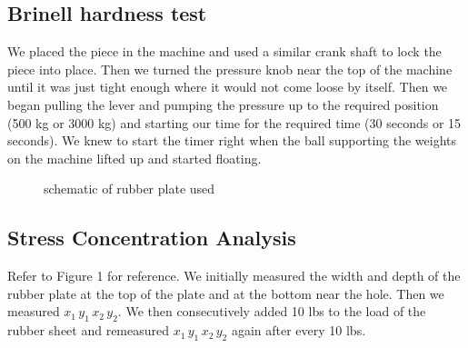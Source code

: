 \documentclass{article}
\begin{document}
\subsection{Brinell hardness test}
We placed the piece in the machine and used a similar crank shaft to lock the piece into place. Then we turned the pressure knob near the top of the machine until it was just tight enough where it would not come loose by itself. Then we began pulling the lever and pumping the pressure up to the required position (500 kg or 3000 kg) and starting our time for the required time (30 seconds or 15 seconds). We knew to start the timer right when the ball supporting the weights on the machine lifted up and started floating.

\begin{figure}[H]
\caption{schematic of rubber plate used}
\centering
{}
\end{figure}

 \subsection{Stress Concentration Analysis}
Refer to Figure 1 for reference. We initially measured the width and depth of the rubber plate at the top of the plate and at the bottom near the hole. Then we measured $x_1 \,y_1 \,x_2 \,y_2$. We then consecutively added 10 lbs to the load of the rubber sheet and remeasured $x_1 \,y_1 \,x_2 \,y_2$ again after every 10 lbs.
\end{document}
